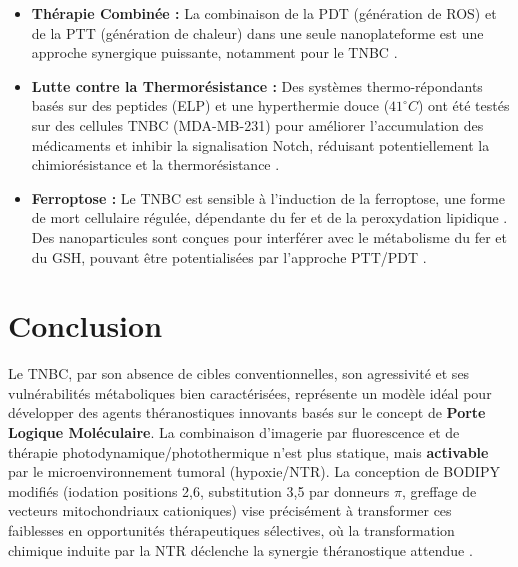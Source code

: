 \begin{itemize}
    \item \textbf{Thérapie Combinée :} La combinaison de la PDT (génération de ROS) et de la PTT (génération de chaleur) dans une seule nanoplateforme est une approche synergique puissante, notamment pour le TNBC  \cite{Ma2021, Ailioaie2025}.
    \item \textbf{Lutte contre la Thermorésistance :} Des systèmes thermo-répondants basés sur des peptides (ELP) et une hyperthermie douce ($41^{\circ}C$) ont été testés sur des cellules TNBC (MDA-MB-231) pour améliorer l'accumulation des médicaments et inhibir la signalisation Notch, réduisant potentiellement la chimiorésistance et la thermorésistance \cite{Go2025}.
    \item \textbf{Ferroptose :} Le TNBC est sensible à l'induction de la ferroptose, une forme de mort cellulaire régulée, dépendante du fer et de la peroxydation lipidique \cite{Zhu2024}. Des nanoparticules sont conçues pour interférer avec le métabolisme du fer et du GSH, pouvant être potentialisées par l'approche PTT/PDT \cite{Li2025}.
\end{itemize}
\section*{Conclusion}
Le TNBC, par son absence de cibles conventionnelles, son agressivité et ses vulnérabilités métaboliques bien caractérisées, représente un modèle idéal pour développer des agents théranostiques innovants basés sur le concept de \textbf{Porte Logique Moléculaire}. La combinaison d'imagerie par fluorescence et de thérapie photodynamique/photothermique n'est plus statique, mais \textbf{activable} par le microenvironnement tumoral (hypoxie/NTR). La conception de BODIPY modifiés (iodation positions 2,6, substitution 3,5 par donneurs $\pi$, greffage de vecteurs mitochondriaux cationiques) vise précisément à transformer ces faiblesses en opportunités thérapeutiques sélectives, où la transformation chimique induite par la NTR déclenche la synergie théranostique attendue \cite{Zhang2022, Wang2025c, Wang2026, Lu2025, Overchuk2023, Li2025}.